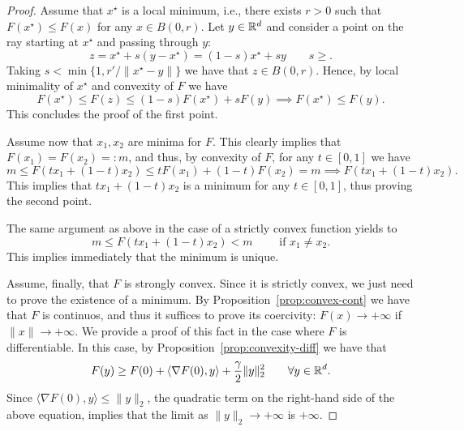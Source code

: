 \documentclass{report}
\begin{document}
	\begin{proof}
		Assume that $x^\star$ is a local minimum, i.e., there exists $r>0$ such that $F(x^\star)\le F(x)$ for any $x\in B(0,r)$. 
		Let $y\in \mathbb{R}^d$ and consider a point on the ray starting at $x^\star$ and passing through $y$:
		\begin{equation}
		z = x^\star + s (y-x^\star) =   (1-s)x^\star + s y\qquad s\ge.
		\end{equation}
		Taking $s < \min\{1, r'/\|x^\star - y\|\}$ we have that $z\in B(0,r)$. Hence, by local minimality of $x^\star$ and convexity of $F$ we have
		\begin{equation}
			F(x^\star) \le F(z) \le (1-s)F(x^\star) + s F(y) \implies F(x^\star) \le F(y).
		\end{equation}
		This concludes the proof of the first point.

		Assume now that $x_1,x_2$ are minima for $F$. This clearly implies that $F(x_1)=F(x_2) =: m$, and thus, by convexity of $F$, for any $t\in [0,1]$ we have
		\begin{equation}
			m \le F(t x_1 + (1-t)x_2) \le t F(x_1) +(1-t) F(x_2) = m \implies F(t x_1 + (1-t)x_2).
		\end{equation}
		This implies that $t x_1 + (1-t)x_2$ is a minimum for any $t\in [0,1]$, thus proving the second point.
		
		The same argument as above in the case of a strictly convex function yields to
		\begin{equation}
			m \le F(tx_1+(1-t)x_2) < m \qquad \text{ if } x_1\neq x_2.
		\end{equation}
		This implies immediately that the minimum is unique.
	
		Assume, finally, that $F$ is strongly convex. Since it is strictly convex, we just need to prove the existence of a minimum. 
		By Proposition~\ref{prop:convex-cont} we have that $F$ is continuos, and thus it suffices to prove its coercivity: $F(x)\to +\infty$ if $\|x\|\to +\infty$. 
		We provide a proof of this fact in the case where $F$ is differentiable. In this case, by Proposition~\ref{prop:convexity-diff} we have that 
		\begin{equation}
			F(y) \ge F(0)+\langle \nabla F(0),y\rangle +\frac\gamma2\|y\|_2^2 \qquad \forall y\in \mathbb{R}^d.
		\end{equation}
		Since $\langle \nabla F(0),y\rangle \le \|y\|_2$, the quadratic term on the right-hand side of the above equation, implies that the limit as $\|y\|_2\to +\infty$ is $+\infty$.
	\end{proof}
\end{document}
